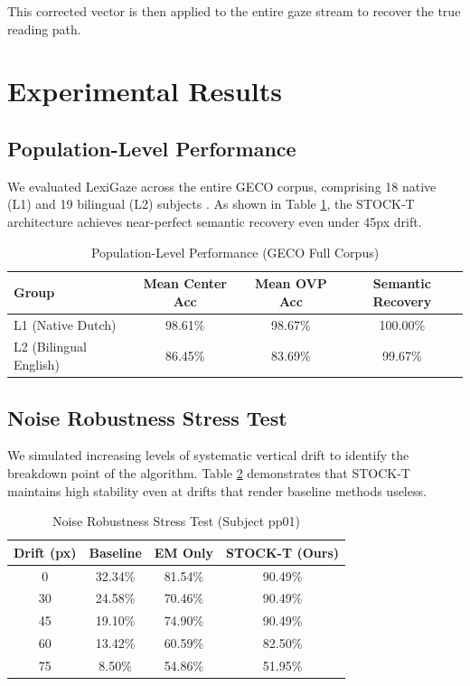 \documentclass{article}
\begin{document}
This corrected vector is then applied to the entire gaze stream to recover the true reading path.

\section{Experimental Results}

\subsection{Population-Level Performance}

We evaluated LexiGaze across the entire GECO corpus, comprising 18 native (L1) and 19 bilingual (L2) subjects \cite{cop2017geco, nahatame2021geco}. As shown in Table \ref{tab:population}, the STOCK-T architecture achieves near-perfect semantic recovery even under 45px drift.

\begin{table}[h]
\caption{Population-Level Performance (GECO Full Corpus)}
\label{tab:population}
\centering
\begin{tabular}{lccc}
\toprule
\textbf{Group} & \textbf{Mean Center Acc} & \textbf{Mean OVP Acc} & \textbf{Semantic Recovery} \\ 
\midrule
L1 (Native Dutch) & 98.61\% & 98.67\% & 100.00\% \\
L2 (Bilingual English) & 86.45\% & 83.69\% & 99.67\% \\ 
\bottomrule
\end{tabular}
\end{table}

\subsection{Noise Robustness Stress Test}

We simulated increasing levels of systematic vertical drift to identify the breakdown point of the algorithm. Table \ref{tab:stress} demonstrates that STOCK-T maintains high stability even at drifts that render baseline methods useless.

\begin{table}[h]
\caption{Noise Robustness Stress Test (Subject pp01)}
\label{tab:stress}
\centering
\begin{tabular}{cccc}
\toprule
\textbf{Drift (px)} & \textbf{Baseline} & \textbf{EM Only} & \textbf{STOCK-T (Ours)} \\ 
\midrule
0 & 32.34\% & 81.54\% & 90.49\% \\
30 & 24.58\% & 70.46\% & 90.49\% \\
45 & 19.10\% & 74.90\% & 90.49\% \\
60 & 13.42\% & 60.59\% & 82.50\% \\
75 & 8.50\% & 54.86\% & 51.95\% \\ 
\bottomrule
\end{tabular}
\end{table}
\end{document}
